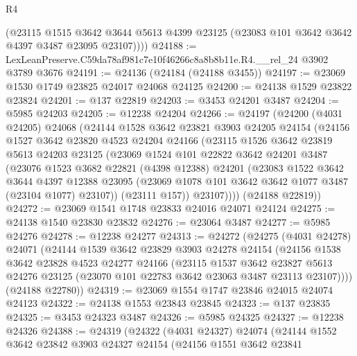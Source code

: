 \begin{lexlean}{R4}
\begin{coremodule}
        (@23115
          @1515
          @3642
          @3644
          @5613
          @4399
          @23125
          (@23083 @101 @3642 @3642 @4397 @3487 @23095 @23107))))
@24188 := LexLeanPreserve.C59da78af981c7e10f46266c8a8b8b11e.R4.__rel_24 @3902 @3789 @3676
@24191 := @24136 (@24184 (@24188 @3455))
@24197 := @23069 @1530 @1749 @23825 @24017 @24068 @24125
@24200 := @24138 @1529 @23822 @23824
@24201 := @137 @22819
@24203 := @3453 @24201 @3487
@24204 := @5985 @24203
@24205 := @12238 @24204
@24266 := @24197
    (@24200
      (@4031 @24205)
      @24068
      (@24144
        @1528
        @3642
        @23821
        @3903
        @24205
        @24154
        (@24156
          @1527
          @3642
          @23820
          @4523
          @24204
          @24166
          (@23115
            @1526
            @3642
            @23819
            @5613
            @24203
            @23125
            (@23069
              @1524
              @101
              @22822
              @3642
              @24201
              @3487
              (@23076
                @1523
                @3682
                @22821
                (@4398 @12388)
                @24201
                (@23083
                  @1522
                  @3642
                  @3644
                  @4397
                  @12388
                  @23095
                  (@23069 @1078 @101 @3642 @3642 @1077 @3487 (@23104 @1077) @23107))
                (@23111 @157))
              @23107))))
      (@24188 @22819))
@24272 := @23069 @1541 @1748 @23833 @24016 @24071 @24124
@24275 := @24138 @1540 @23830 @23832
@24276 := @23064 @3487
@24277 := @5985 @24276
@24278 := @12238 @24277
@24313 := @24272
    (@24275
      (@4031 @24278)
      @24071
      (@24144
        @1539
        @3642
        @23829
        @3903
        @24278
        @24154
        (@24156
          @1538
          @3642
          @23828
          @4523
          @24277
          @24166
          (@23115
            @1537
            @3642
            @23827
            @5613
            @24276
            @23125
            (@23070 @101 @22783 @3642 @23063 @3487 @23113 @23107))))
      (@24188 @22780))
@24319 := @23069 @1554 @1747 @23846 @24015 @24074 @24123
@24322 := @24138 @1553 @23843 @23845
@24323 := @137 @23835
@24325 := @3453 @24323 @3487
@24326 := @5985 @24325
@24327 := @12238 @24326
@24388 := @24319
    (@24322
      (@4031 @24327)
      @24074
      (@24144
        @1552
        @3642
        @23842
        @3903
        @24327
        @24154
        (@24156
          @1551
          @3642
          @23841

\end{coremodule}
\end{lexlean}
